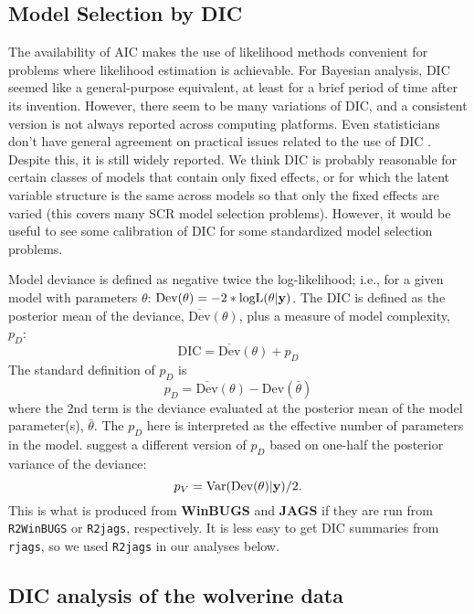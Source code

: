 {\subsection{Model Selection by DIC }

The availability of AIC makes the use of likelihood methods convenient
for problems where likelihood estimation is achievable.  For Bayesian
analysis, DIC seemed like a
general-purpose equivalent, at least for a brief period of time after
its invention.  However, there seem to be many variations of DIC, and
a consistent version is not always reported across computing
platforms.
Even statisticians don't have general agreement on practical issues
related to the use of DIC \citep{millar:2009}.
Despite this, it is
still widely reported. We think DIC is probably reasonable for certain
classes of models that contain only fixed effects, or for which the
latent variable structure is the same across models so that only the
fixed effects are varied (this covers many SCR model selection
problems).  However, it would be useful to see some calibration of DIC
for some standardized model selection problems.

Model deviance is defined as negative twice the log-likelihood;
i.e., for a given model with parameters $\theta$: $\mbox{Dev}(\theta) =
-2*\mbox{logL}(\theta|{\bf y})$.  The DIC is defined as the
posterior mean of the deviance, $\overline{\mbox{Dev}}(\theta)$, plus a measure of model complexity,
$p_{D}$:
\[
 \mbox{DIC} = \overline{\mbox{Dev}}(\theta) + p_{D}
\]
The standard definition of $p_{D}$ is
\[
 p_{D} = \overline{\mbox{Dev}}(\theta) - \mbox{Dev}(\bar{\theta})
\]
where the 2nd term is the deviance evaluated at the posterior mean of
the model parameter(s), $\bar{\theta}$. The $p_{D}$ here is interpreted as the effective
number of parameters in the model.  \citet{gelman_etal:2004} suggest a
different version of $p_{D}$ based on one-half the posterior variance
of the deviance:
\[
 p_{V} = \mbox{Var}(\mbox{Dev}(\theta)|{\bf y})/2.
\]
This is what is produced from {\bf WinBUGS} and {\bf JAGS} if they are
run from \mbox{\tt R2WinBUGS} or \mbox{\tt R2jags}, respectively.  It
is less easy to get DIC summaries from \mbox{\tt rjags}, so we 
used \mbox{\tt R2jags} in our analyses below.


\subsection{DIC analysis of the wolverine data}
\label{gof.sec.dicwolverine}


}
